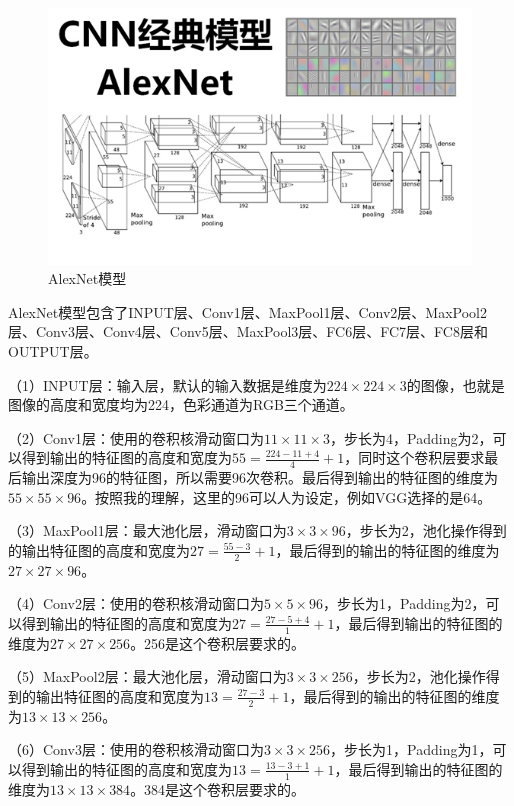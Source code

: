 \documentclass[12pt,a4paper,openany]{book}
\begin{document}
\begin{figure}[h]%
\centering  %
\includegraphics[width=0.7\linewidth]{figures/AlexNet.png}  %
\caption{AlexNet模型}  %
\label{fig:AlexNet}   %
\end{figure}

AlexNet模型包含了INPUT层、Conv1层、MaxPool1层、Conv2层、MaxPool2层、Conv3层、Conv4层、Conv5层、MaxPool3层、FC6层、FC7层、FC8层和OUTPUT层。

（1）INPUT层：输入层，默认的输入数据是维度为$224 \times 224 \times 3$的图像，也就是图像的高度和宽度均为224，色彩通道为RGB三个通道。

（2）Conv1层：使用的卷积核滑动窗口为$11 \times 11 \times 3$，步长为4，Padding为2，可以得到输出的特征图的高度和宽度为$55 = \frac{224 - 11 + 4}{4} + 1$，同时这个卷积层要求最后输出深度为96的特征图，所以需要96次卷积。最后得到输出的特征图的维度为$55 \times 55 \times 96$。按照我的理解，这里的96可以人为设定，例如VGG选择的是64。

（3）MaxPool1层：最大池化层，滑动窗口为$3 \times 3 \times 96$，步长为2，池化操作得到的输出特征图的高度和宽度为$27 = \frac{55 - 3}{2} + 1$，最后得到的输出的特征图的维度为$27 \times 27 \times 96$。

（4）Conv2层：使用的卷积核滑动窗口为$5 \times 5 \times 96$，步长为1，Padding为2，可以得到输出的特征图的高度和宽度为$27 = \frac{27 - 5 + 4}{1} + 1$，最后得到输出的特征图的维度为$27 \times 27 \times 256$。256是这个卷积层要求的。

（5）MaxPool2层：最大池化层，滑动窗口为$3 \times 3 \times 256$，步长为2，池化操作得到的输出特征图的高度和宽度为$13 = \frac{27 - 3}{2} + 1$，最后得到的输出的特征图的维度为$13 \times 13 \times 256$。

（6）Conv3层：使用的卷积核滑动窗口为$3 \times 3 \times 256$，步长为1，Padding为1，可以得到输出的特征图的高度和宽度为$13 = \frac{13 - 3 + 1}{1} + 1$，最后得到输出的特征图的维度为$13 \times 13 \times 384$。384是这个卷积层要求的。
\end{document}

